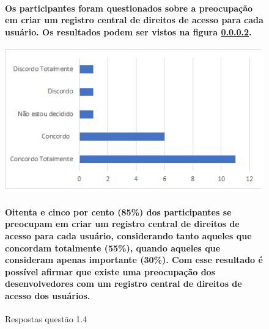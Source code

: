 \begin{figure}[!t]
\centering
\paragraph{
Os participantes foram questionados sobre a preocupação em criar um registro central de direitos de acesso para cada usuário. Os resultados podem ser vistos na figura \ref{fig:1.4}.
}
\includegraphics[scale=0.7]{figuras das questoes/1.4.png}
\caption{Respostas questão 1.4}

\paragraph{
Oitenta e cinco por cento (85{\%}) dos participantes se preocupam em criar um registro central de direitos de acesso para cada usuário, considerando tanto aqueles que concordam totalmente (55{\%}), quando aqueles que consideram apenas importante (30{\%}). Com esse resultado é possível afirmar que existe uma preocupação dos desenvolvedores com um registro central de direitos de acesso dos usuários.
}

\label{fig:1.4}
\end{figure}
